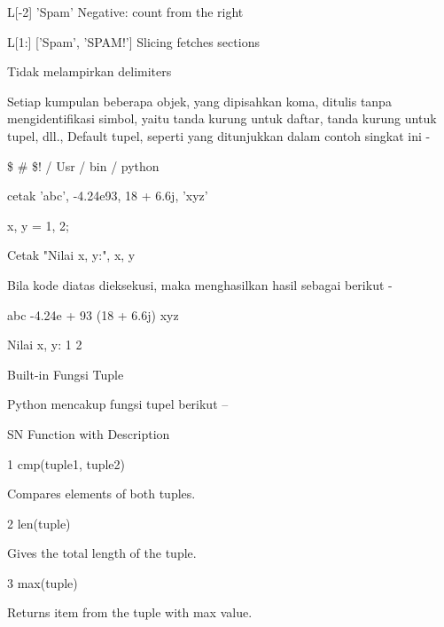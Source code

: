L[-2] \hspace*{0.5in} 'Spam' \hspace*{0.5in} Negative: count from the right \par
L[1:] \hspace*{0.5in} ['Spam', 'SPAM!'] \hspace*{0.5in} Slicing fetches sections \par
\vspace{12pt}
Tidak melampirkan delimiters \par
Setiap kumpulan beberapa objek, yang dipisahkan koma, ditulis tanpa mengidentifikasi simbol, yaitu tanda kurung untuk daftar, tanda kurung untuk tupel, dll., Default tupel, seperti yang ditunjukkan dalam contoh singkat ini - \par
 \$  \#  \$! / Usr / bin / python \par
\vspace{12pt}
cetak 'abc', -4.24e93, 18 + 6.6j, 'xyz' \par
x, y = 1, 2; \par
Cetak "Nilai x, y:", x, y \par
Bila kode diatas dieksekusi, maka menghasilkan hasil sebagai berikut - \par
abc -4.24e + 93 (18 + 6.6j) xyz \par
Nilai x, y: 1 2 \par
Built-in Fungsi Tuple \par
Python mencakup fungsi tupel berikut – \par
\vspace{12pt}
\vspace{12pt}
\vspace{12pt}
SN \hspace*{0.5in} Function with Description \par
1 \hspace*{0.5in} cmp(tuple1, tuple2) \par
\vspace{12pt}
Compares elements of both tuples. \par
2 \hspace*{0.5in} len(tuple) \par
\vspace{12pt}
Gives the total length of the tuple. \par
3 \hspace*{0.5in} max(tuple) \par
\vspace{12pt}
Returns item from the tuple with max value. \par
